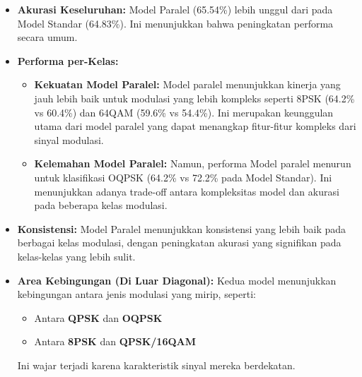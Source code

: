 \documentclass{article}
\begin{document}
\begin{itemize}
    \item \textbf{Akurasi Keseluruhan:} Model Paralel (65.54\%) lebih unggul dari pada Model Standar (64.83\%). Ini menunjukkan bahwa peningkatan performa secara umum.
    
    \item \textbf{Performa per-Kelas:}
    \begin{itemize}
        \item \textbf{Kekuatan Model Paralel:} Model paralel menunjukkan kinerja yang jauh lebih baik untuk modulasi yang lebih kompleks seperti 8PSK (64.2\% vs 60.4\%) dan 64QAM (59.6\% vs 54.4\%). Ini merupakan keunggulan utama dari model paralel yang dapat menangkap fitur-fitur kompleks dari sinyal modulasi.
        \item \textbf{Kelemahan Model Paralel:} Namun, performa Model paralel menurun untuk klasifikasi OQPSK (64.2\% vs 72.2\% pada Model Standar). Ini menunjukkan adanya trade-off antara kompleksitas model dan akurasi pada beberapa kelas modulasi.
    \end{itemize}
    
    \item \textbf{Konsistensi:} Model Paralel menunjukkan konsistensi yang lebih baik pada berbagai kelas modulasi, dengan peningkatan akurasi yang signifikan pada kelas-kelas yang lebih sulit.
    
    \item \textbf{Area Kebingungan (Di Luar Diagonal):} Kedua model menunjukkan kebingungan antara jenis modulasi yang mirip, seperti:
    \begin{itemize}
        \item Antara \textbf{QPSK} dan \textbf{OQPSK}
        \item Antara \textbf{8PSK} dan \textbf{QPSK/16QAM}
    \end{itemize}
    Ini wajar terjadi karena karakteristik sinyal mereka berdekatan.
\end{itemize}
\end{document}

